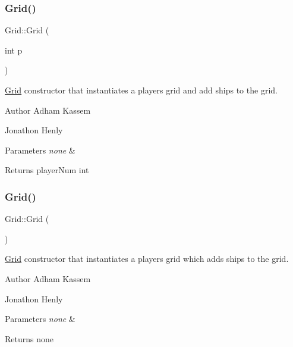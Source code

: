 \subsubsection{\texorpdfstring{Grid()}{Grid()}\hspace{0.1cm}{\footnotesize\ttfamily [1/2]}}
{\footnotesize\ttfamily Grid\+::\+Grid (\begin{DoxyParamCaption}\item[{int}]{p }\end{DoxyParamCaption})\hspace{0.3cm}{\ttfamily [inline]}}

\hyperlink{classGrid}{Grid} constructor that instantiates a players grid and add ships to the grid. \begin{DoxyAuthor}{Author}
Adham Kassem 

Jonathon Henly 
\end{DoxyAuthor}

\begin{DoxyParams}{Parameters}
{\em none} & \\
\hline
\end{DoxyParams}
\begin{DoxyReturn}{Returns}
player\+Num int 
\end{DoxyReturn}
\mbox{\label{classGrid_a4ac9ff4f63552b4c61ff90fcb35ad66c}} 
\subsubsection{\texorpdfstring{Grid()}{Grid()}\hspace{0.1cm}{\footnotesize\ttfamily [2/2]}}
{\footnotesize\ttfamily Grid\+::\+Grid (\begin{DoxyParamCaption}{ }\end{DoxyParamCaption})\hspace{0.3cm}{\ttfamily [inline]}}

\hyperlink{classGrid}{Grid} constructor that instantiates a players grid which adds ships to the grid. \begin{DoxyAuthor}{Author}
Adham Kassem 

Jonathon Henly 
\end{DoxyAuthor}

\begin{DoxyParams}{Parameters}
{\em none} & \\
\hline
\end{DoxyParams}
\begin{DoxyReturn}{Returns}
none 
\end{DoxyReturn}


